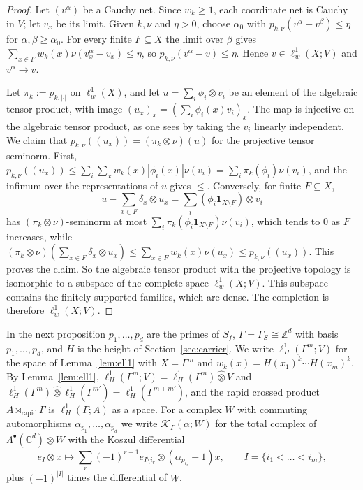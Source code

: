 \documentclass[11pt]{amsart}
\theoremstyle{definition}
\theoremstyle{remark}
\newcommand{\C}{\mathbb C}
\newcommand{\Z}{\mathbb Z}
\begin{document}
\begin{proof}
Let $(v^{\alpha})$ be a Cauchy net.  Since $w_k\ge1$, each coordinate net is
Cauchy in $V$; let $v_x$ be its limit.  Given $k,\nu$ and $\eta>0$, choose
$\alpha_0$ with $p_{k,\nu}(v^{\alpha}-v^{\beta})\le\eta$ for
$\alpha,\beta\ge\alpha_0$.  For every finite $F\subseteq X$ the limit over
$\beta$ gives $\sum_{x\in F}w_k(x)\nu(v^{\alpha}_x-v_x)\le\eta$, so
$p_{k,\nu}(v^{\alpha}-v)\le\eta$.  Hence $v\in\ell^{1}_{w}(X;V)$ and
$v^{\alpha}\to v$.

Let $\pi_k:=p_{k,|\cdot|}$ on $\ell^{1}_{w}(X)$, and let $u=\sum_i\phi_i\otimes v_i$
be an element of the algebraic tensor product, with image
$(u_x)_x=(\sum_i\phi_i(x)v_i)_x$.  The map is injective on the algebraic tensor
product, as one sees by taking the $v_i$ linearly independent.  We claim that
$p_{k,\nu}((u_x))=(\pi_k\otimes\nu)(u)$ for the projective tensor seminorm.
First, $p_{k,\nu}((u_x))\le\sum_i\sum_xw_k(x)|\phi_i(x)|\nu(v_i)=\sum_i\pi_k(\phi_i)
\nu(v_i)$, and the infimum over the representations of $u$ gives $\le$.
Conversely, for finite $F\subseteq X$,
\[
u-\sum_{x\in F}\delta_x\otimes u_x=\sum_i(\phi_i\mathbf 1_{X\setminus F})\otimes v_i
\]
has $(\pi_k\otimes\nu)$-seminorm at most
$\sum_i\pi_k(\phi_i\mathbf 1_{X\setminus F})\nu(v_i)$, which tends to $0$ as $F$
increases, while $(\pi_k\otimes\nu)(\sum_{x\in F}\delta_x\otimes u_x)\le
\sum_{x\in F}w_k(x)\nu(u_x)\le p_{k,\nu}((u_x))$.  This proves the claim.  So the
algebraic tensor product with the projective topology is isomorphic to a
subspace of the complete space $\ell^{1}_{w}(X;V)$.  This subspace contains the
finitely supported families, which are dense.  The completion is therefore
$\ell^{1}_{w}(X;V)$.
\end{proof}

In the next proposition $p_1,\dots,p_d$ are the primes of $S_f$,
$\Gamma=\Gamma_S\cong\Z^{d}$ with basis $p_1,\dots,p_d$, and $H$ is the height
of Section~\ref{sec:carrier}.  We write $\ell^{1}_{H}(\Gamma^{m};V)$ for the
space of Lemma~\ref{lem:ell1} with $X=\Gamma^{m}$ and
$w_k(x)=H(x_1)^{k}\cdots H(x_m)^{k}$.  By Lemma~\ref{lem:ell1},
$\ell^{1}_{H}(\Gamma^{m};V)=\ell^{1}_{H}(\Gamma^{m})\widehat\otimes V$ and
$\ell^{1}_{H}(\Gamma^{m})\widehat\otimes\ell^{1}_{H}(\Gamma^{m'})=
\ell^{1}_{H}(\Gamma^{m+m'})$, and the rapid crossed product
$A\rtimes_{\mathrm{rapid}}\Gamma$ is $\ell^{1}_{H}(\Gamma;A)$ as a space.  For a
complex $W$ with commuting automorphisms $\alpha_{p_1},\dots,\alpha_{p_d}$ we
write $\mathcal K_{\Gamma}(\alpha;W)$ for the total complex of
$\Lambda^{\bullet}(\C^{d})\otimes W$ with the Koszul differential
\[
e_I\otimes x\longmapsto\sum_{r}(-1)^{r-1}e_{I\setminus i_r}\otimes
(\alpha_{p_{i_r}}-1)x,\qquad I=\{i_1<\dots<i_m\},
\]
plus $(-1)^{|I|}$ times the differential of $W$.
\end{document}

